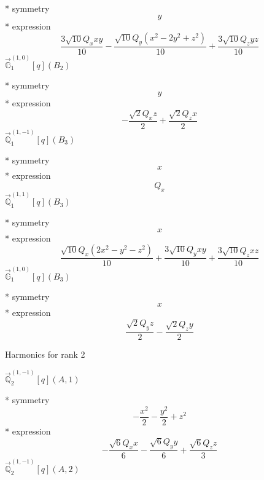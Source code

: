 \documentclass[fleqn,8pt]{jsarticle}
\begin{document}
\noindent\quad ** symmetry
\begin{dmath*}
y
\end{dmath*}
\noindent\quad ** expression
\begin{dmath*}
\frac{3 \sqrt{10} Q_{x} x y}{10} - \frac{\sqrt{10} Q_{y} \left(x^{2} - 2 y^{2} + z^{2}\right)}{10} + \frac{3 \sqrt{10} Q_{z} y z}{10}
\end{dmath*}
\noindent\quad $\vec{\mathbb{G}}_{1}^{(1,0)}[q](B_{2})$

\noindent\quad ** symmetry
\begin{dmath*}
y
\end{dmath*}
\noindent\quad ** expression
\begin{dmath*}
- \frac{\sqrt{2} Q_{x} z}{2} + \frac{\sqrt{2} Q_{z} x}{2}
\end{dmath*}
\noindent\quad $\vec{\mathbb{Q}}_{1}^{(1,-1)}[q](B_{3})$

\noindent\quad ** symmetry
\begin{dmath*}
x
\end{dmath*}
\noindent\quad ** expression
\begin{dmath*}
Q_{x}
\end{dmath*}
\noindent\quad $\vec{\mathbb{Q}}_{1}^{(1,1)}[q](B_{3})$

\noindent\quad ** symmetry
\begin{dmath*}
x
\end{dmath*}
\noindent\quad ** expression
\begin{dmath*}
\frac{\sqrt{10} Q_{x} \left(2 x^{2} - y^{2} - z^{2}\right)}{10} + \frac{3 \sqrt{10} Q_{y} x y}{10} + \frac{3 \sqrt{10} Q_{z} x z}{10}
\end{dmath*}
\noindent\quad $\vec{\mathbb{G}}_{1}^{(1,0)}[q](B_{3})$

\noindent\quad ** symmetry
\begin{dmath*}
x
\end{dmath*}
\noindent\quad ** expression
\begin{dmath*}
\frac{\sqrt{2} Q_{y} z}{2} - \frac{\sqrt{2} Q_{z} y}{2}
\end{dmath*}

\noindent * Harmonics for rank 2

\noindent\quad $\vec{\mathbb{Q}}_{2}^{(1,-1)}[q](A,1)$

\noindent\quad ** symmetry
\begin{dmath*}
- \frac{x^{2}}{2} - \frac{y^{2}}{2} + z^{2}
\end{dmath*}
\noindent\quad ** expression
\begin{dmath*}
- \frac{\sqrt{6} Q_{x} x}{6} - \frac{\sqrt{6} Q_{y} y}{6} + \frac{\sqrt{6} Q_{z} z}{3}
\end{dmath*}
\noindent\quad $\vec{\mathbb{Q}}_{2}^{(1,-1)}[q](A,2)$
\end{document}
